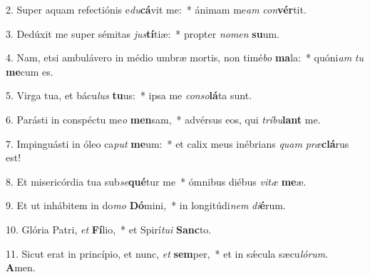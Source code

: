 2. Super aquam refectiónis e\textit{du}\textbf{cá}vit me:~*  ánimam me\textit{am} \textit{con}\textbf{vér}tit.\

3. Dedúxit me super sémitas \textit{jus}\textbf{tí}tiæ:~*  propter \textit{no}\textit{men} \textbf{su}um.\

4. Nam, etsi ambulávero in médio umbræ mortis, non timé\textit{bo} \textbf{ma}la:~*  quóni\textit{am} \textit{tu} \textbf{me}cum es.\

5. Virga tua, et bácu\textit{lus} \textbf{tu}us:~*  ipsa me \textit{con}\textit{so}\textbf{lá}ta sunt.\

6. Parásti in conspéctu me\textit{o} \textbf{men}sam,~*  advérsus eos, qui \textit{trí}\textit{bu}\textbf{lant} me.\

7. Impinguásti in óleo ca\textit{put} \textbf{me}um:~*  et calix meus inébrians \textit{quam} \textit{præ}\textbf{clá}rus est!\

8. Et misericórdia tua sub\textit{se}\textbf{qué}tur me~*  ómnibus diébus \textit{vi}\textit{tæ} \textbf{me}æ.\

9. Et ut inhábitem in do\textit{mo} \textbf{Dó}mini,~*  in longitúdi\textit{nem} \textit{di}\textbf{é}rum.\

10. Glória Patri, \textit{et} \textbf{Fí}lio,~*  et Spirí\textit{tu}\textit{i} \textbf{Sanc}to.\

11. Sicut erat in princípio, et nunc, \textit{et} \textbf{sem}per,~*  et in sǽcula sæcu\textit{ló}\textit{rum}. \textbf{A}men.\

